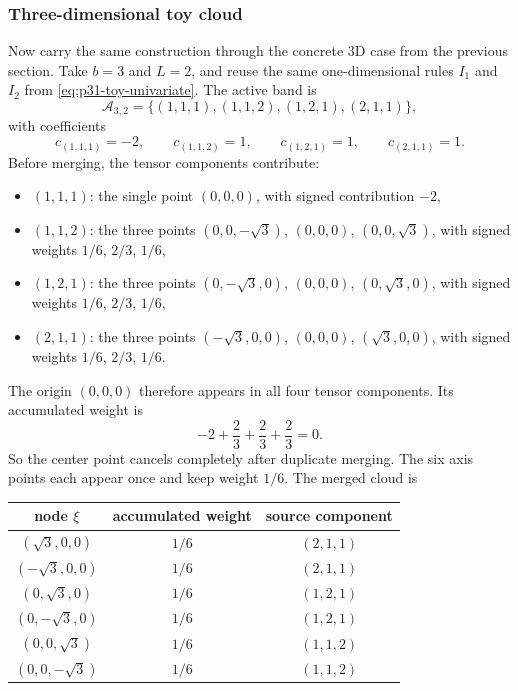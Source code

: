 \documentclass[11pt]{article}
\numberwithin{equation}{section}
\begin{document}
\subsubsection{Three-dimensional toy cloud}

Now carry the same construction through the concrete 3D case from the previous
section.  Take \(b=3\) and \(L=2\), and reuse the same one-dimensional rules
\(I_1\) and \(I_2\) from \eqref{eq:p31-toy-univariate}.  The active band is
\begin{equation}
  \mathcal A_{3,2}
  =
  \{(1,1,1),(1,1,2),(1,2,1),(2,1,1)\},
  \label{eq:p38-3d-toy-indices}
\end{equation}
with coefficients
\begin{equation}
  c_{(1,1,1)}=-2,
  \qquad
  c_{(1,1,2)}=1,
  \qquad
  c_{(1,2,1)}=1,
  \qquad
  c_{(2,1,1)}=1.
  \label{eq:p38-3d-toy-coefficients}
\end{equation}
Before merging, the tensor components contribute:
\begin{itemize}[leftmargin=0.28in]
  \item \((1,1,1)\): the single point \((0,0,0)\), with signed contribution
  \(-2\),
  \item \((1,1,2)\): the three points
  \((0,0,-\sqrt3)\), \((0,0,0)\), \((0,0,\sqrt3)\), with signed weights
  \(1/6\), \(2/3\), \(1/6\),
  \item \((1,2,1)\): the three points
  \((0,-\sqrt3,0)\), \((0,0,0)\), \((0,\sqrt3,0)\), with signed weights
  \(1/6\), \(2/3\), \(1/6\),
  \item \((2,1,1)\): the three points
  \((-\sqrt3,0,0)\), \((0,0,0)\), \((\sqrt3,0,0)\), with signed weights
  \(1/6\), \(2/3\), \(1/6\).
\end{itemize}
The origin \((0,0,0)\) therefore appears in all four tensor components.  Its
accumulated weight is
\begin{equation}
  -2+\frac23+\frac23+\frac23=0.
  \label{eq:p38-3d-origin-weight}
\end{equation}
So the center point cancels completely after duplicate merging.  The six axis
points each appear once and keep weight \(1/6\).  The merged cloud is
\begin{center}
\begin{tabular}{ccc}
\toprule
node \(\xi\) & accumulated weight & source component \\
\midrule
\((\sqrt3,0,0)\) & \(1/6\) & \((2,1,1)\) \\
\(( -\sqrt3,0,0)\) & \(1/6\) & \((2,1,1)\) \\
\((0,\sqrt3,0)\) & \(1/6\) & \((1,2,1)\) \\
\((0,-\sqrt3,0)\) & \(1/6\) & \((1,2,1)\) \\
\((0,0,\sqrt3)\) & \(1/6\) & \((1,1,2)\) \\
\((0,0,-\sqrt3)\) & \(1/6\) & \((1,1,2)\) \\
\bottomrule
\end{tabular}
\end{center}
\end{document}
